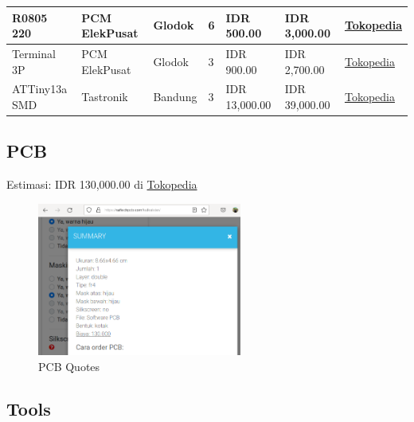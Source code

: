 \documentclass[a4paper,12pt,oneside,pdflatex,italian,final,twocolumn]{article}
\begin{document}
\begin{table}[!ht]
\begin{tabular}{|l|l|l|l|l|l|l|}
			R0805 220 & PCM ElekPusat & Glodok & 6 & IDR 500.00 & IDR 3,000.00 & \href{https://www.tokopedia.com/pcmelektronik/resistor-smd-0805-221-220-ohm}{Tokopedia} \\ \hline
			Terminal 3P & PCM ElekPusat & Glodok & 3 & IDR 900.00 & IDR 2,700.00 & \href{https://www.tokopedia.com/pcmelektronik/terminal-pcb-block-screw-3pin-kf301}{Tokopedia} \\ \hline
			ATTiny13a SMD & Tastronik & Bandung & 3 & IDR 13,000.00 & IDR 39,000.00 & \href{https://www.tokopedia.com/tastronik/attiny13a-ssu-smd-attiny-13-attiny13-atmega-avr-marking-tipe-2}{Tokopedia} \\ \hline
		\end{tabular}
	\end{table}
	
	\newpage
	\subsection{PCB}
	
	Estimasi: IDR 130,000.00 di \href{https://www.tokopedia.com/raftech/jasa-cetak-pcb-general}{Tokopedia}
	
	\begin{figure}[h]
		\centering
		\includegraphics[width=0.6\textwidth]{images/pcb_quotes.png}
		\caption{PCB Quotes}
	\end{figure}
	
	\subsection{Tools}
	
\end{document}

